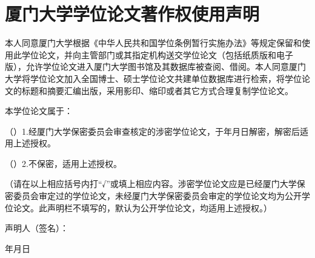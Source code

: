 \ExplSyntaxOn
\chapter*{厦门大学学位论文著作权使用声明}{}
%
{
本人同意厦门大学根据《中华人民共和国学位条例暂行实施办法》等规定保留和使用此学位论文，并向主管部门或其指定机构送交学位论文（包括纸质版和电子版），允许学位论文进入厦门大学图书馆及其数据库被查阅、借阅。本人同意厦门大学将学位论文加入全国博士、硕士学位论文共建单位数据库进行检索，将学位论文的标题和摘要汇编出版，采用影印、缩印或者其它方式合理复制学位论文。\par

本学位论文属于：\par

（\qquad ）1.经厦门大学保密委员会审查核定的涉密学位论文，于\qquad 年\qquad 月\qquad 日解密，解密后适用上述授权。\par

（\qquad ）2.不保密，适用上述授权。\par

（请在以上相应括号内打“√”或填上相应内容。涉密学位论文应是已经厦门大学保密委员会审定过的学位论文，未经厦门大学保密委员会审定的学位论文均为公开学位论文。此声明栏不填写的，默认为公开学位论文，均适用上述授权。）\par

\vspace{12ex}
{
    \raggedleft
    声明人（签名）：\phantom{六个字的空白}\par
    年\qquad 月\qquad 日\phantom{这七个字的空白}\par
}
}
\ExplSyntaxOff